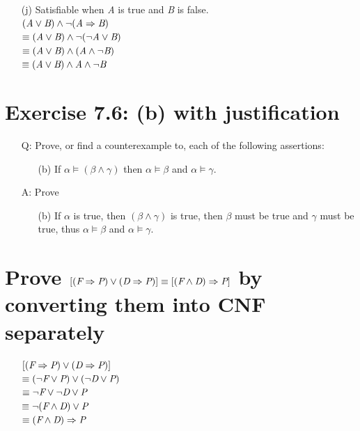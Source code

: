 \documentclass{article}
\begin{document}
\begin{itemize}
\begin{itemize}
\item[(j)]Satisfiable when \textit A is true and \textit B is false.\\$(\textit A \vee \textit B) \wedge \neg (\textit A \Rightarrow \textit B)$\\$\equiv (\textit A \vee \textit B) \wedge \neg (\neg \textit A \vee \textit B)$\\$\equiv (\textit A \vee \textit B) \wedge (\textit A \wedge \neg \textit B)$\\$\equiv (\textit A \vee \textit B) \wedge \textit A \wedge \neg \textit B$
\end{itemize}
\end{itemize}

\section{Exercise 7.6: (b) with justification}
\begin{itemize}
\item[Q:]Prove, or find a counterexample to, each of the following assertions:
\begin{itemize}
\item[(b)]If $\alpha \models (\beta \wedge \gamma)$ then $\alpha \models \beta$ and $\alpha \models \gamma$.
\end{itemize}
\item[A:]Prove
\begin{itemize}
\item[(b)]If $\alpha$ is true, then $(\beta \wedge \gamma)$ is true, then $\beta$ must be true and $\gamma$ must be true, thus $\alpha \models \beta$ and $\alpha \models \gamma$.
\end{itemize}
\end{itemize}


\section{Prove $[(\textit F \Rightarrow \textit P) \vee (\textit D \Rightarrow \textit P)] \equiv [(\textit F \wedge \textit D) \Rightarrow \textit P]$ by converting them into CNF separately}
\begin{itemize}
\item[ ]$[(\textit F \Rightarrow \textit P) \vee (\textit D \Rightarrow \textit P)]$\\$\equiv (\neg \textit F \vee \textit P) \vee (\neg \textit D \vee \textit P)$\\$\equiv \neg \textit F \vee \neg \textit D \vee \textit P$\\$\equiv \neg (\textit F \wedge \textit D) \vee \textit P$\\$\equiv (\textit F \wedge \textit D) \Rightarrow \textit P$
\end{itemize}
\end{document}
